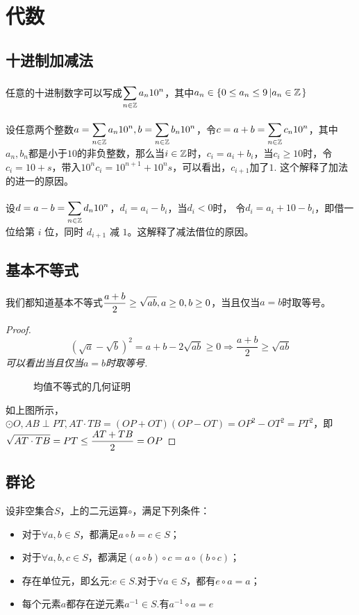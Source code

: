 \section{代数}
\subsection{十进制加减法}
任意的十进制数字可以写成\(\displaystyle\sum_{n\in\mathbb{Z}}^{}a_n10^n\)，其中\(a_n\in \{0\le a_n\le9 \left| a_n\in\mathbb{Z}\right.\}\)

设任意两个整数\(\displaystyle a = \sum_{n\in\mathbb{Z}}^{}a_n10^n, b = \sum_{n\in\mathbb{Z}}^{}b_n10^n\)，令\(\displaystyle c = a + b = \sum_{n\in\mathbb{Z}}^{}c_n10^n\)，其中\(
a_n, b_n\)都是小于\(10\)的非负整数，那么当\(i\in\mathbb{Z}\)时，\(c_i = a_i + b_i\)，当\(c_i \ge 10\)时，令\(c_i = 10 + s\)，带入\(10^nc_i = 10^{n+1} + 10^ns\)，可以看出，\(c_{i+1}\)加了\(1\).
这个解释了加法的进一的原因。

设\(\displaystyle d = a - b = \sum_{n\in\mathbb{Z}}^{}d_n10^n\)，\(d_i = a_i - b_i\)，当\(d_i<0\)时，
令\(d_i = a_i + 10 - b_i\)，即借一位给第 \(i\) 位，同时 \(d_{i+1}\) 减 \(1\)。这解释了减法借位的原因。

\subsection{基本不等式}
我们都知道基本不等式\(\displaystyle \frac{a+b}{2}\ge\sqrt{ab},a\ge0, b\ge0\)，当且仅当\(a=b\)时取等号。
\begin{proof}\itshape
\[
    (\sqrt{a}-\sqrt{b})^2=a+b-2\sqrt{ab}\ge0 \Rightarrow \frac{a+b}{2}\ge \sqrt{ab}
\]
可以看出当且仅当\(a = b\)时取等号.
\begin{figure}[H]
    \centering
    \caption{均值不等式的几何证明}
    \label{fig:basic-ineq-proof}
\end{figure}

如上图所示，\(\odot O, AB\perp PT, AT\cdot TB = (OP+OT)(OP-OT) = OP^2-OT^2 = PT^2\)，即
\(\displaystyle \sqrt{AT\cdot TB} = PT\le \frac{AT + TB}{2} = OP\)
\end{proof}

\subsection{群论}
设非空集合\(S\)，上的二元运算\(\circ\)，满足下列条件：
\begin{itemize}
    \item 对于\(\forall a, b\in S\)，都满足\(a\circ b = c\in S\)；
    \item 对于\(\forall a, b, c\in S\)，都满足\((a\circ b)\circ c = a\circ(b\circ c)\)；
    \item 存在单位元，即幺元:\(e\in S\).对于\(\forall a\in S\)，都有\(e \circ a = a\)；
    \item 每个元素\(a\)都存在逆元素\(a^{-1}\in S\).有\(a^{-1}\circ a = e\)
\end{itemize}

